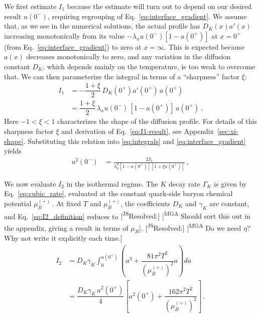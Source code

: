 \documentclass[10pt,superscriptaddress,
amsmath,aps,prc,twocolumn,nofootinbib,floatfix]{revtex4-1}
\newcommand{\mga}[1]{{\color[rgb]{0.6,0,0}#1}}
\newcommand{\mgacom}[1]{\textsf{\color[rgb]{0.8,0,0}[\textsuperscript{MGA} #1]}}
\newcommand{\JS}[1]{{\color{violet}#1}}
\newcommand{\JScom}[1]{\textsf{\color{violet} [\textsuperscript{JS}#1]}}
\newcommand{\Ga}{\Gamma}
\newcommand{\dsp}{\displaystyle}
\newcommand{\Bratio}{\lambda_n}
\begin{document}
We first estimate $I_1$ because the estimate will turn out to depend on our desired result $u(0^-)$, requiring regrouping of Eq.~\ref{eq:interface_gradient}.
We assume that, as we see in the numerical solutions, the actual profile has $D_K(x) a'(x)$ increasing monotonically from its value $-\Bratio u(0^-)[1-a(0^+)]$ at $x=0^+$ (from Eq.~\eqref{eq:interface_gradient}) to zero at $x=\infty$.
This is expected because $a(x)$ decreases monotonically to zero, and any variation in the diffusion constant $D_K$, which depends mainly on the temperature, is too weak to overcome that.
We can then parameterize the integral in terms of a ``sharpness'' factor $\xi$:
\begin{equation}
\begin{array}{rl}
 I_1 &= -\dfrac{1+\xi}{2}\,D_K(0^+) a'(0^+)\, a(0^+) \\[2ex]
  &= \dfrac{1+\xi}{2}\,
 \Bratio u(0^-)\,[1-a(0^+)]\,a(0^+)\,.
 \end{array}
 \label{eq:I1-result}
\end{equation}
Here $-1<\xi<1$ characterizes the shape of the diffusion profile.
\JS{For details of this sharpness factor $\xi$ and derivation of Eq.~\eqref{eq:I1-result}, see Appendix~\ref{sec:xi-shape}.}
Substituting this relation into \eqref{eq:integrals} and \eqref{eq:interface_gradient} yields
\begin{align}
 u^2(0^-)&= \frac{2 I_2}
 {\Bratio^2[1-a(0^+)][1+\xi a(0^+)]}\,,
\label{eq:speed_general}
\end{align}


\mga{We now evaluate $I_2$ in the isothermal regime.
The $K$ decay rate $\Ga_K$ is given by Eq.~\eqref{eq:cubic_rate}, evaluated at the constant quark-side baryon chemical potential $\mu_B^{(+)}\,.$
At fixed $T$ and $\mu_B^{(+)}$, the coefficients} $D_K$ and $\gamma_K$ are constant, and Eq.~\eqref{eq:I2_definition} reduces to
\JScom{Resolved:} \mgacom{Should sort this out in the appendix, giving a result in terms of $\mu_B$}.
\JScom{Resolved:} \mgacom{Do we need $\eta$? Why not write it explicitly each time.}
\begin{equation}
\begin{array}{rl}
 I_2 &= D_K\gamma_K\dsp\int_0^{a(0^+)}\left(a^3+\dfrac{81\pi^2T^2}{(\mu_B^{(+)})^2}a\right)da \\[2ex]
 &= \dfrac{D_K\gamma_K\,a^2(0^+)}{4}\left[a^2(0^+)+\dfrac{162\pi^2T^2}{(\mu_B^{(+)})^2}\right]\,.
\end{array}
\label{eq:I2_isothermal}
\end{equation}
\end{document}
